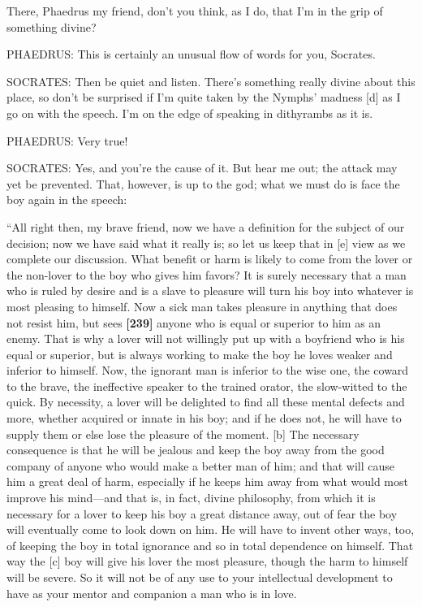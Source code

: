 There, Phaedrus my friend, don't you think, as I do, that I'm in the
grip of something divine?

PHAEDRUS: This is certainly an unusual flow of words for you, Socrates.

SOCRATES: Then be quiet and listen. There's something really divine
about this place, so don't be surprised if I'm quite taken by the
Nymphs' madness {[}d{]} as I go on with the speech. I'm on the edge of
speaking in dithyrambs
as it is.

PHAEDRUS: Very true!

SOCRATES: Yes, and you're the cause of it. But hear me out; the attack
may yet be prevented. That, however, is up to the god; what we must do
is face the boy again in the speech:

“All right then, my brave friend, now we have a definition for the
subject of our decision; now we have said what it really is; so let us
keep that in {[}e{]} view as we complete our discussion. What benefit or
harm is likely to come from the lover or the non-lover to the boy who
gives him favors? It is surely necessary that a man who is ruled by
desire and is a slave to pleasure will turn his boy into whatever is
most pleasing to himself. Now a sick man takes pleasure in anything that
does not resist him, but sees {\bf {[}239{]}} anyone who is equal or
superior to him as an enemy. That is why a lover will not willingly put
up with a boyfriend who is his equal or superior, but is always working
to make the boy he loves weaker and inferior to himself. Now, the
ignorant man is inferior to the wise one, the coward to the brave, the
ineffective speaker to the trained orator, the slow-witted to the quick.
By necessity, a lover will be delighted to find all these mental defects
and more, whether acquired or innate in his boy; and if he does not, he
will have to supply them or else lose the pleasure of the moment.
{[}b{]} The necessary consequence is that he will be jealous and keep
the boy away from the good company of anyone who would make a better man
of him; and that will cause him a great deal of harm, especially if he
keeps him away from what would most improve his mind---and that is, in
fact, divine philosophy, from which it is necessary for a lover to keep
his boy a great distance away, out of fear the boy will eventually come
to look down on him. He will have to invent other ways, too, of keeping
the boy in total ignorance and so in total dependence on himself. That
way the {[}c{]} boy will give his lover the most pleasure, though the
harm to himself will be severe. So it will not be of any use to your
intellectual development to have as your mentor and companion a man who
is in love.

